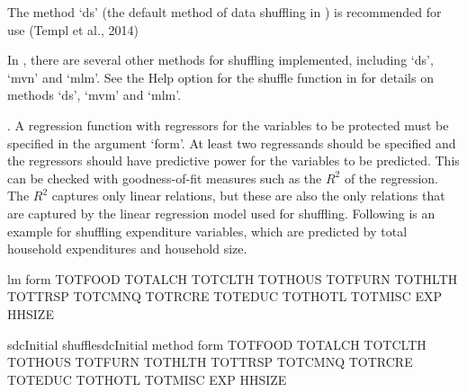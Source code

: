\documentclass[letterpaper,10pt,english]{sphinxmanual}
\begin{document}
The method ‘ds’ (the default method of data shuffling in ) is
recommended for use (Templ et al., 2014) %
\begin{footnote}[21]\sphinxAtStartFootnote
In , there are several other methods for shuffling
implemented, including ‘ds’, ‘mvn’ and ‘mlm’. See the Help option for
the shuffle function in  for details on methods ‘ds’, ‘mvm’
and ‘mlm’.
%
\end{footnote}. A
regression function with regressors for the variables to be protected
must be specified in the argument ‘form’. At least two regressands
should be specified and the regressors should have predictive power for
the variables to be predicted. This can be checked with goodness-of-fit
measures such as the \(R^{2}\) of the regression. The \(R^{2}\)
captures only linear relations, but these are also the only relations
that are captured by the linear regression model used for shuffling.
Following is an example for shuffling expenditure variables, which are
predicted by total household expenditures and household size.

\def\sphinxLiteralBlockLabel{\label{\detokenize{anon_methods:code524}}}
%
\begin{sphinxVerbatim}[commandchars=\\\{\},numbers=left,firstnumber=1,stepnumber=1]
 lm form  TOTFOOD   TOTALCH  TOTCLTH  TOTHOUS  TOTFURN  TOTHLTH   TOTTRSP  TOTCMNQ  TOTRCRE  TOTEDUC  TOTHOTL  TOTMISC  EXP  HHSIZE

 sdcInitial  shufflesdcInitial method form  TOTFOOD   TOTALCH  TOTCLTH  TOTHOUS  TOTFURN  TOTHLTH   TOTTRSP  TOTCMNQ  TOTRCRE  TOTEDUC  TOTHOTL  TOTMISC  EXP  HHSIZE
\end{sphinxVerbatim}
\end{document}

